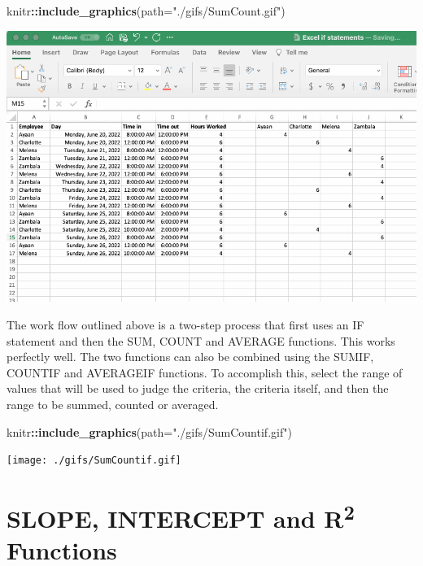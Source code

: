 \documentclass[
]{book}
\newenvironment{Shaded}{\begin{snugshade}}{\end{snugshade}}
\newcommand{\AttributeTok}[1]{\textcolor[rgb]{0.13,0.29,0.53}{#1}}
\newcommand{\FunctionTok}[1]{\textcolor[rgb]{0.13,0.29,0.53}{\textbf{#1}}}
\newcommand{\NormalTok}[1]{#1}
\newcommand{\SpecialCharTok}[1]{\textcolor[rgb]{0.81,0.36,0.00}{\textbf{#1}}}
\newcommand{\StringTok}[1]{\textcolor[rgb]{0.31,0.60,0.02}{#1}}
\begin{document}
\begin{Shaded}
\begin{Highlighting}[]
\NormalTok{knitr}\SpecialCharTok{::}\FunctionTok{include\_graphics}\NormalTok{(}\AttributeTok{path=}\StringTok{"./gifs/SumCount.gif"}\NormalTok{)}
\end{Highlighting}
\end{Shaded}

\includegraphics{./gifs/SumCount.gif}

The work flow outlined above is a two-step process that first uses an IF statement and then the SUM, COUNT and AVERAGE functions. This works perfectly well. The two functions can also be combined using the SUMIF, COUNTIF and AVERAGEIF functions. To accomplish this, select the range of values that will be used to judge the criteria, the criteria itself, and then the range to be summed, counted or averaged.

\begin{Shaded}
\begin{Highlighting}[]
\NormalTok{knitr}\SpecialCharTok{::}\FunctionTok{include\_graphics}\NormalTok{(}\AttributeTok{path=}\StringTok{"./gifs/SumCountif.gif"}\NormalTok{)}
\end{Highlighting}
\end{Shaded}

\texttt{[image: ./gifs/SumCountif.gif]}

\hypertarget{slope-intercept-and-r2-functions}{%
\section{\texorpdfstring{SLOPE, INTERCEPT and R\textsuperscript{2} Functions}{SLOPE, INTERCEPT and R2 Functions}}\label{slope-intercept-and-r2-functions}}
\end{document}
